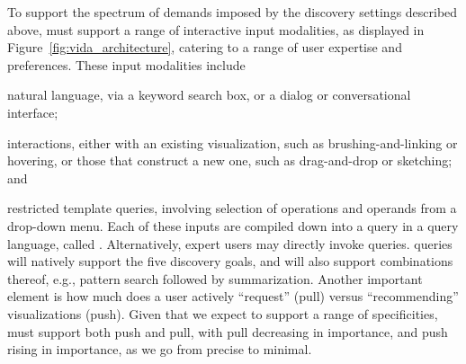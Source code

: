 \par
{} To support the spectrum of 
demands imposed by the
discovery settings described above, \vida 
must support a range of interactive input modalities,
as displayed in Figure~\ref{fig:vida_architecture},
catering to a range of user expertise and preferences.
These input modalities include 
\squishlist
	\item natural language, via a keyword search box, or a dialog or conversational interface;
	\item interactions, either with an existing visualization, such as brushing-and-linking or hovering, or those that construct a new one, such as drag-and-drop or sketching; and
	\item restricted template queries, involving selection of operations and operands from a drop-down menu.
\squishend
Each of these inputs are compiled down
into a query in a query language, called \vidaql.
Alternatively, expert users may directly invoke \vidaql queries.
\vidaql queries will natively support the five discovery goals,
and will also support combinations thereof, e.g., pattern search followed by 
summarization. 
Another important element is how much does a user actively ``request'' (pull)
versus \vida ``recommending'' visualizations (push). 
Given that we expect \vida to support a range of specificities,
\vida must support both push and pull, with pull decreasing
in importance, and push rising in importance, as we go from precise to minimal.









